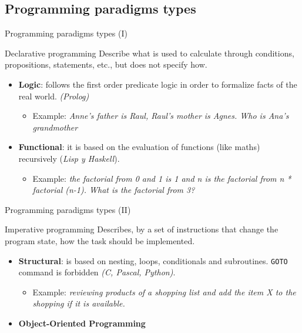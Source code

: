 \documentclass[10pt,compress]{beamer} %
\begin{document}
\subsection[Programming paradigms types]{Programming paradigms types}

\begin{frame}{Programming paradigms types (I)}{}
	\begin{block}{Declarative programming}
Describe \alert{what} is used to calculate through conditions, propositions, statements, etc., but does not specify \alert{how}.
  	\end{block}
  	\begin{itemize}
  		\item \textbf{Logic}: follows the first order predicate logic in order to formalize facts of the real world. 								  \textit{(Prolog)}
  		\begin{itemize}
  			\item Example: \textit{Anne's father is Raul, Raul's mother is Agnes. Who is Ana's grandmother} 
  		\end{itemize}
  		\item \textbf{Functional}: it is based on the evaluation of functions (like maths) recursively  (\textit{Lisp y Haskell}).
  		\begin{itemize}
  			\item Example: \textit{the factorial from 0 and 1 is 1 and n is the factorial from n * factorial (n-1). What is the factorial from 3?} 
  		\end{itemize}
  	\end{itemize}
\end{frame}

\begin{frame}{Programming paradigms types (II)}
	\begin{block}{Imperative programming}
		Describes, by a set of instructions that change the \alert{program state}, \alert{how} the task should be implemented.  
  	\end{block}
  	\begin{itemize}
  		\item \textbf{Structural}: is based on nesting, loops, conditionals and subroutines. \texttt{GOTO} command is forbidden 				 \textit{(C, Pascal, Python)}.
  		\begin{itemize}
  			\item Example: \textit{reviewing products of a shopping list and add the item X to the shopping if it is available.} 
  		\end{itemize}
        \item \textbf{Object-Oriented Programming}
  	\end{itemize}
\end{frame}
\end{document}
